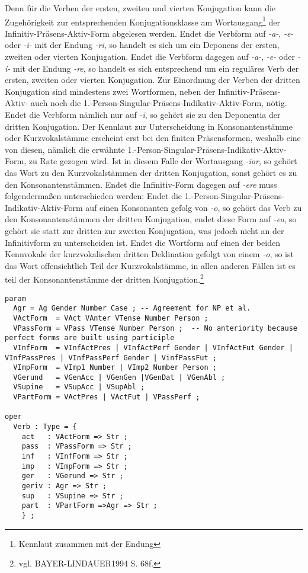 \documentclass[12pt,abstract=on,titlepage,bibliography=totoc,ngerman,listof=totoc]{scrreprt}
\begin{document}
Denn für die Verben der ersten, zweiten und vierten Konjugation kann die Zugehörigkeit zur entsprechenden Konjugationsklasse am Wortausgang\footnote{Kennlaut zusammen mit der Endung} der Infinitiv-Präsens-Aktiv-Form abgelesen werden. Endet die Verbform auf \textit{-a-}, \textit{-e-} oder \textit{-i-} mit der Endung \textit{-ri}, so handelt es sich um ein Deponens der ersten, zweiten oder vierten Konjugation. Endet die Verbform dagegen auf \textit{-a-}, \textit{-e-} oder \textit{-i-} mit der Endung \textit{-re}, so handelt es sich entsprechend um ein reguläres Verb der ersten, zweiten oder vierten Konjugation. Zur Einordnung der Verben der dritten Konjugation sind mindestens zwei Wortformen, neben der Infinitiv-Präsens-Aktiv- auch noch die 1.-Person-Singular-Präsens-Indikativ-Aktiv-Form, nötig. Endet die Verbform nämlich nur auf \textit{-i}, so gehört sie zu den Deponentia der dritten Konjugation. Der Kennlaut zur Unterscheidung in Konsonantenstämme oder Kurzvokalstämme erscheint erst bei den finiten Präsensformen, weshalb eine von diesen, nämlich die erwähnte 1.-Person-Singular-Präsens-Indikativ-Aktiv-Form, zu Rate gezogen wird. Ist in diesem Falle der Wortausgang \textit{-ior}, so gehört das Wort zu den Kurzvokalstämmen der dritten Konjugation, sonst gehört es zu den Konsonantenstämmen. Endet die Infinitiv-Form dagegen auf \textit{-ere} muss folgendermaßen unterschieden werden: Endet die 1.-Person-Singular-Präsens-Indikativ-Aktiv-Form auf einen Konsonanten gefolg von \textit{-o}, so gehört das Verb zu den Konsonantenstämmen der dritten Konjugation, endet diese Form auf \textit{-eo}, so gehört sie statt zur dritten zur zweiten Konjugation, was jedoch nicht an der Infinitivform zu unterscheiden ist. Endet die Wortform auf einen der beiden Kennvokale der kurzvokalischen dritten Deklination gefolgt von einem \textit{-o}, so ist das Wort offensichtlich Teil der Kurzvokalstämme, in allen anderen Fällen ist es teil der Konsonantenstämme der dritten Konjugation.\footnote{vgl. BAYER-LINDAUER1994 S. 68f.} \par
\begin{lstlisting}[float=ht,label={GF-Res-Verb},caption={Datentyp eines Verbs im Grammatical Framework}]
param
  Agr = Ag Gender Number Case ; -- Agreement for NP et al.
  VActForm  = VAct VAnter VTense Number Person ;
  VPassForm = VPass VTense Number Person ;  -- No anteriority because perfect forms are built using participle
  VInfForm  = VInfActPres | VInfActPerf Gender | VInfActFut Gender | VInfPassPres | VInfPassPerf Gender | VinfPassFut ;
  VImpForm  = VImp1 Number | VImp2 Number Person ;
  VGerund   = VGenAcc | VGenGen |VGenDat | VGenAbl ;
  VSupine   = VSupAcc | VSupAbl ;
  VPartForm = VActPres | VActFut | VPassPerf ;

oper
  Verb : Type = {
    act   : VActForm => Str ;
    pass  : VPassForm => Str ;
    inf   : VInfForm => Str ;
    imp   : VImpForm => Str ;
    ger   : VGerund => Str ;
    geriv : Agr => Str ; 
    sup   : VSupine => Str ;
    part  : VPartForm =>Agr => Str ;
    } ;
\end{lstlisting}
\FloatBarrier
\end{document}
